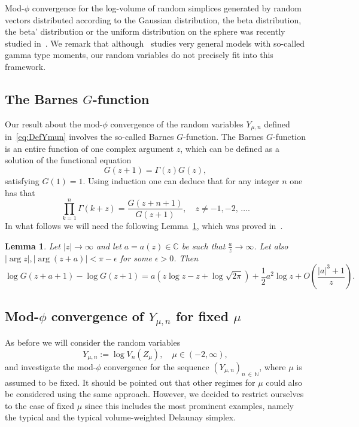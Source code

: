 \documentclass[10pt]{amsart}
\newtheorem{lemm}[theo]{Lemma}\newtheorem{prop}[theo]{Proposition}\newtheorem{coro}[theo]{Corollary}\newtheorem{conj}[theo]{Conjecture}
\theoremstyle{definition}\newtheorem{defi}[theo]{Definition}\newtheorem{rema}[theo]{Remark}\newtheorem{exam}[theo]{Example}\newtheorem{exem}[theo]{Example}\newtheorem{nota}[theo]{Notation}
\begin{document}
Mod-$\phi$ convergence for the log-volume of random simplices generated by random vectors distributed according to the Gaussian distribution, the beta distribution, the beta' distribution or the uniform distribution on the sphere was recently studied in~\cite{EKGammaMoments,GKT17}. We remark that although~\cite{EKGammaMoments} studies very general models with so-called gamma type moments, our random variables do not precisely fit into this framework.

\subsection{The Barnes \texorpdfstring{$G$}{G}-function}

Our result about the mod-$\phi$ convergence of the random variables $Y_{\mu,n}$ defined in~\eqref{eq:DefYmun} involves the so-called Barnes $G$-function. The Barnes $G$-function is an entire function of one complex argument $z$, which can be defined as a solution of the functional equation
\[
G(z+1)=\Gamma(z)G(z),
\]
satisfying $G(1)=1$. Using induction one can deduce that for any integer $n$ one has that
\begin{equation}\label{eq:BarnesFunct}
\prod\limits_{k=1}^n\Gamma(k+z)=\frac{G(z+n+1)}{G(z+1)},\quad z\neq -1,-2,\,\ldots.
\end{equation}
In what follows we will need the following Lemma~\ref{lm:BarnesFuncAsymp}, which was proved in~\cite[Lemma~4.1]{GKT17}.

\begin{lemm}\label{lm:BarnesFuncAsymp}
Let $|z|\rightarrow \infty$ and let $a=a(z)\in\mathbb{C}$ be such that $\frac{a}{z}\rightarrow \infty$. Let also $|\arg z|, |\arg (z+a)|<\pi-\epsilon$ for some $\epsilon >0$. Then
\[
\log G(z+a+1)-\log G(z+1)=a\left(z\log z-z+\log\sqrt{2\pi}\right)+\frac{1}{2}a^2\log z+O\left(\frac{|a|^3+1}{z}\right).
\]
\end{lemm}

\subsection{Mod-\texorpdfstring{$\phi$}{phi} convergence of \texorpdfstring{$Y_{\mu,n}$}{Y mu,n} for fixed \texorpdfstring{$\mu$}{mu}}

As before we will consider the random variables
\[
Y_{\mu,n}:=\log V_n(Z_{\mu}),\quad \mu\in(-2,\infty),
\]
and investigate the mod-$\phi$ convergence for the sequence $(Y_{\mu,n})_{n\,\in\,\mathbb{N}}$, where $\mu$ is assumed to be fixed. It should be pointed out that other regimes for $\mu$ could also be considered using the same approach. However, we decided to restrict ourselves to the case of fixed $\mu$ since this includes the most prominent examples, namely the typical and the typical volume-weighted Delaunay simplex.
\end{document}
